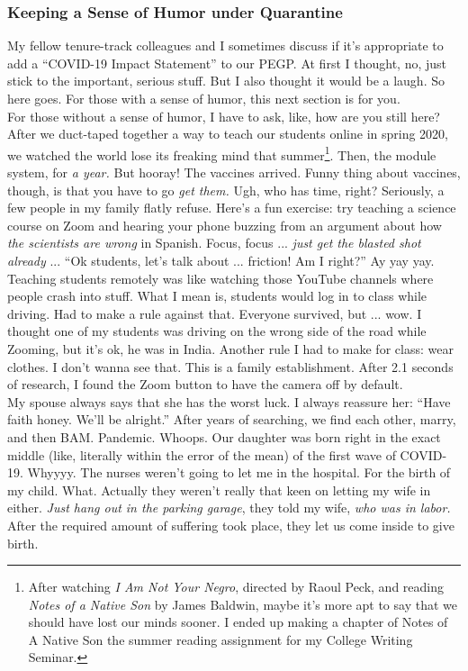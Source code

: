 \documentclass[../../main.tex]{subfiles}
\begin{document}
\subsubsection{Keeping a Sense of Humor under Quarantine}

My fellow tenure-track colleagues and I sometimes discuss if it's appropriate to add a ``COVID-19 Impact Statement'' to our PEGP.  At first I thought, no, just stick to the important, serious stuff.  But I also thought it would be a laugh.  So here goes.  For those with a sense of humor, this next section is for you.  
\\
\vspace{0.25cm}
For those without a sense of humor, I have to ask, like, how are you still here?  After we duct-taped together a way to teach our students online in spring 2020, we watched the world lose its freaking mind that summer\footnote{After watching \textit{I Am Not Your Negro}, directed by Raoul Peck, and reading \textit{Notes of a Native Son} by James Baldwin, maybe it's more apt to say that we should have lost our minds sooner. I ended up making a chapter of Notes of A Native Son the summer reading assignment for my College Writing Seminar.}.  Then, the module system, for \textit{a year.}  But hooray!  The vaccines arrived.  Funny thing about vaccines, though, is that you have to go \textit{get them.}  Ugh, who has time, right?  Seriously, a few people in my family flatly refuse.  Here's a fun exercise: try teaching a science course on Zoom and hearing your phone buzzing from an argument about how \textit{the scientists are wrong} in Spanish.  Focus, focus ... \textit{just get the blasted shot already} ... ``Ok students, let's talk about ... friction!  Am I right?''  Ay yay yay.
\\
\vspace{0.25cm}
Teaching students remotely was like watching those YouTube channels where people crash into stuff.  What I mean is, students would log in to class while driving.  Had to make a rule against that.  Everyone survived, but ... wow.  I thought one of my students was driving on the wrong side of the road while Zooming, but it's ok, he was in India.  Another rule I had to make for class: wear clothes.  I don't wanna see that.  This is a family establishment.  After 2.1 seconds of research, I found the Zoom button to have the camera off by default.
\\
\vspace{0.25cm}
My spouse always says that she has the worst luck.  I always reassure her: ``Have faith honey.  We'll be alright.''  After years of searching, we find each other, marry, and then BAM.  Pandemic.  Whoops.  Our daughter was born right in the exact middle (like, literally within the error of the mean) of the first wave of COVID-19.  Whyyyy.  The nurses weren't going to let me in the hospital.  For the birth of my child.  What.  Actually they weren't really that keen on letting my wife in either.  \textit{Just hang out in the parking garage}, they told my wife, \textit{who was in labor.}  After the required amount of suffering took place, they let us come inside to give birth.
\end{document}
